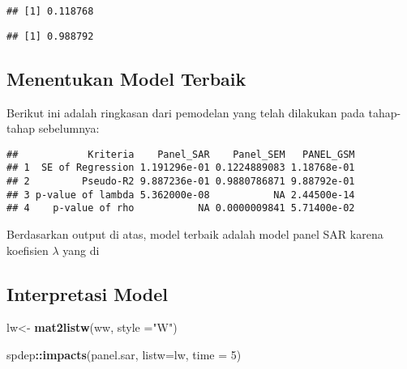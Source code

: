 \documentclass[
]{book}
\newenvironment{Shaded}{\begin{snugshade}}{\end{snugshade}}
\newcommand{\CommentTok}[1]{\textcolor[rgb]{0.56,0.35,0.01}{\textit{#1}}}
\newcommand{\DataTypeTok}[1]{\textcolor[rgb]{0.13,0.29,0.53}{#1}}
\newcommand{\DecValTok}[1]{\textcolor[rgb]{0.00,0.00,0.81}{#1}}
\newcommand{\KeywordTok}[1]{\textcolor[rgb]{0.13,0.29,0.53}{\textbf{#1}}}
\newcommand{\NormalTok}[1]{#1}
\newcommand{\OperatorTok}[1]{\textcolor[rgb]{0.81,0.36,0.00}{\textbf{#1}}}
\newcommand{\StringTok}[1]{\textcolor[rgb]{0.31,0.60,0.02}{#1}}
\begin{document}
\begin{Shaded}
\end{Shaded}

\begin{verbatim}
## [1] 0.118768
\end{verbatim}

\begin{Shaded}
\end{Shaded}

\begin{verbatim}
## [1] 0.988792
\end{verbatim}

\hypertarget{menentukan-model-terbaik-1}{%
\subsection{Menentukan Model Terbaik}\label{menentukan-model-terbaik-1}}

Berikut ini adalah ringkasan dari pemodelan yang telah dilakukan pada tahap-tahap sebelumnya:

\begin{verbatim}
##            Kriteria    Panel_SAR    Panel_SEM   PANEL_GSM
## 1  SE of Regression 1.191296e-01 0.1224889083 1.18768e-01
## 2         Pseudo-R2 9.887236e-01 0.9880786871 9.88792e-01
## 3 p-value of lambda 5.362000e-08           NA 2.44500e-14
## 4    p-value of rho           NA 0.0000009841 5.71400e-02
\end{verbatim}

Berdasarkan output di atas, model terbaik adalah model panel SAR karena koefisien \(\lambda\) yang di

\hypertarget{interpretasi-model}{%
\subsection{Interpretasi Model}\label{interpretasi-model}}

\begin{Shaded}
\begin{Highlighting}[]
\NormalTok{lw\textless{}{-}}\StringTok{ }\KeywordTok{mat2listw}\NormalTok{(ww, }\DataTypeTok{style =}\StringTok{"W"}\NormalTok{)}

\NormalTok{spdep}\OperatorTok{::}\KeywordTok{impacts}\NormalTok{(panel.sar, }\DataTypeTok{listw=}\NormalTok{lw, }\DataTypeTok{time =} \DecValTok{5}\NormalTok{)}
\end{Highlighting}
\end{Shaded}
\end{document}
